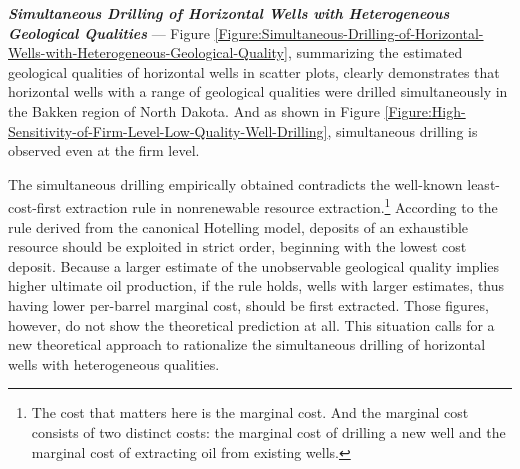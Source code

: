 \par
\vspace{0.3cm}
\noindent
\textit{\textbf{Simultaneous Drilling of Horizontal Wells with Heterogeneous Geological Qualities}} --- Figure \ref{Figure:Simultaneous-Drilling-of-Horizontal-Wells-with-Heterogeneous-Geological-Quality}, summarizing the estimated geological qualities of horizontal wells in scatter plots, clearly demonstrates that horizontal wells with a range of geological qualities were drilled simultaneously in the Bakken region of North Dakota. And as shown in Figure \ref{Figure:High-Sensitivity-of-Firm-Level-Low-Quality-Well-Drilling}, simultaneous drilling is observed even at the firm level. 

The simultaneous drilling empirically obtained contradicts the well-known least-cost-first extraction rule in nonrenewable resource extraction.\footnote{The cost that matters here is the marginal cost. And the marginal cost consists of two distinct costs: the marginal cost of drilling a new well and the marginal cost of extracting oil from existing wells.} According to the rule derived from the canonical Hotelling model, deposits of an exhaustible resource should be exploited in strict order, beginning with the lowest cost deposit. Because a larger estimate of the unobservable geological quality implies higher ultimate oil production, if the rule holds, wells with larger estimates, thus having lower per-barrel marginal cost, should be first extracted. Those figures, however, do not show the theoretical prediction at all. This situation calls for a new theoretical approach to rationalize the simultaneous drilling of horizontal wells with heterogeneous qualities. 
